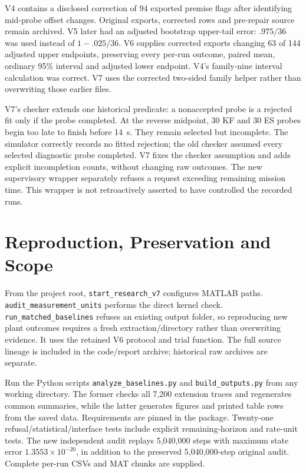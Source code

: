 \documentclass[10pt,journal]{IEEEtran}
\begin{document}
V4 contains a disclosed correction of 94 exported premise flags after identifying mid-probe offset changes. Original exports, corrected rows and pre-repair source remain archived. V5 later had an adjusted bootstrap upper-tail error: $.975/36$ was used instead of $1-.025/36$. V6 supplies corrected exports changing 63 of 144 adjusted upper endpoints, preserving every per-run outcome, paired mean, ordinary 95\% interval and adjusted lower endpoint. V4's family-nine interval calculation was correct. V7 uses the corrected two-sided family helper rather than overwriting those earlier files.

V7's checker extends one historical predicate: a nonaccepted probe is a rejected fit only if the probe completed. At the reverse midpoint, 30 KF and 30 ES probes begin too late to finish before 14~s. They remain selected but incomplete. The simulator correctly records no fitted rejection; the old checker assumed every selected diagnostic probe completed. V7 fixes the checker assumption and adds explicit incompletion counts, without changing raw outcomes. The new supervisory wrapper separately refuses a request exceeding remaining mission time. This wrapper is not retroactively asserted to have controlled the recorded runs.

\section{Reproduction, Preservation and Scope}
From the project root, \texttt{start\_research\_v7} configures MATLAB paths. \texttt{audit\_measurement\_units} performs the direct kernel check. \texttt{run\_matched\_baselines} refuses an existing output folder, so reproducing new plant outcomes requires a fresh extraction/directory rather than overwriting evidence. It uses the retained V6 protocol and trial function. The full source lineage is included in the code/report archive; historical raw archives are separate.

Run the Python scripts \texttt{analyze\_baselines.py} and \texttt{build\_outputs.py} from any working directory. The former checks all 7,200 extension traces and regenerates common summaries, while the latter generates figures and printed table rows from the saved data. Requirements are pinned in the package. Twenty-one refusal/statistical/interface tests include explicit remaining-horizon and rate-unit tests. The new independent audit replays 5,040,000 steps with maximum state error $1.3553\times10^{-20}$, in addition to the preserved 5,040,000-step original audit. Complete per-run CSVs and MAT chunks are supplied.
\end{document}
